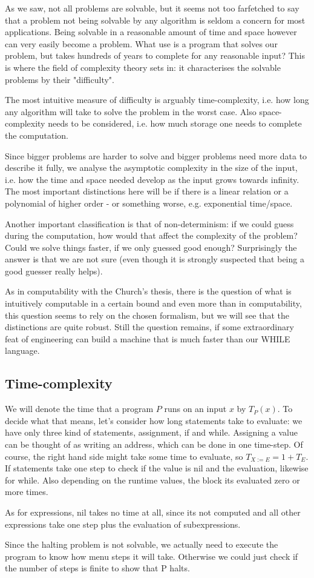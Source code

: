 As we saw, not all problems are solvable, but it seems not too farfetched to
say that a problem not being solvable by any algorithm is seldom a concern for
most applications. Being solvable in a reasonable amount of time and space
however can very easily become a problem. What use is a program that solves our
problem, but takes hundreds of years to complete for any reasonable input? This
is where the field of complexity theory sets in: it characterises the solvable
problems by their "difficulty".

The most intuitive measure of difficulty is arguably time-complexity, i.e. how
long any algorithm will take to solve the problem in the worst case. Also
space-complexity needs to be considered, i.e. how much storage one needs to
complete the computation.

Since bigger problems are harder to solve and bigger problems need more data to
describe it fully, we analyse the asymptotic complexity in the size of the
input, i.e. how the time and space needed develop as the input grows towards
infinity. The most important distinctions here will be if there is a linear
relation or a polynomial of higher order - or something worse, e.g. exponential
time/space.

Another important classification is that of non-determinism: if we could guess
during the computation, how would that affect the complexity of the problem?
Could we solve things faster, if we only guessed good enough? Surprisingly the
answer is that we are not sure (even though it is strongly suspected that being
a good guesser really helps).

As in computability with the Church's thesis, there is the question of what is
intuitively computable in a certain bound and even more than in computability,
this question seems to rely on the chosen formalism, but we will see that the
distinctions are quite robust. Still the question remains, if some
extraordinary feat of engineering can build a machine that is much faster than
our WHILE language.

\subsection{Time-complexity}
We will denote the time that a program $P$ runs on an input $x$ by $T_P(x)$. To
decide what that means, let's consider how long statements take to evaluate: we
have only three kind of statements, assignment, if and while. Assigning a value
can be thought of as writing an address, which can be done in one time-step. Of
course, the right hand side might take some time to evaluate, so $T_{X := E} = 1
+ T_E$. If statements take one step to check if the value is nil and the
evaluation, likewise for while. Also depending on the runtime values, the block
its evaluated zero or more times.

As for expressions, nil takes no time at all, since its not computed and all
other expressions take one step plus the evaluation of subexpressions.

Since the halting problem is not solvable, we actually need to execute the
program to know how menu steps it will take. Otherwise we could just check if
the number of steps is finite to show that P halts.


